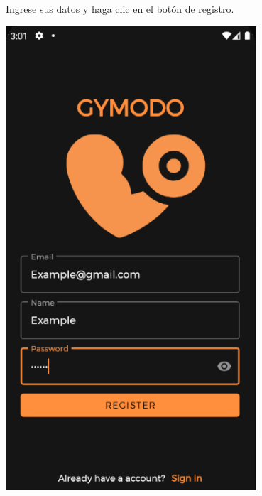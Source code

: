 \documentclass[12pt,a4paper]{article}
\begin{document}
\begin{enumerate}
\begin{minipage}{.60\textwidth}
  \item Ingrese sus datos y haga clic en el botón de registro.
\end{minipage}
\begin{minipage}{.40\textwidth}
  \includegraphics[width=0.7\textwidth, right]{registerpage}
\end{minipage}


\end{enumerate}
\end{document}
